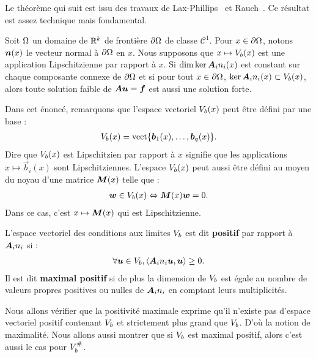 Le théorème qui suit est issu des travaux de Lax-Phillips~\cite{existence_solution_lax_phillips} et Rauch~\cite{existence_solution_rauch}.
Ce résultat est assez technique mais fondamental.

\begin{theorem} \label{thm:lax_phillips}
	Soit $\Omega$ un domaine de $\mathbb{R}^k$ de frontière
	$\partial\Omega$ de classe $\mathcal{C}^1$.
	Pour $x \in \partial\Omega$, notons $\bm{n}(x)$ le vecteur normal
	à $\partial\Omega$ en $x$.
	Nous supposons que $x \mapsto V_b(x)$
	est une application Lipschitzienne par rapport à $x$.
	Si $\dim \ker {\bm{A}_{i}n_{i}}(x)$ est constant sur chaque composante connexe
	de $\partial\Omega$ et si pour tout $x \in \partial\Omega$,
	$\ker {\bm{A}_{i}n_{i}}(x) \subset V_b(x)$,
	alors toute solution faible de $\bm{A} \bm{u} = \bm{f}$
	est aussi une solution forte.
\end{theorem}

Dans cet énoncé, remarquons que l'espace vectoriel $V_b(x)$
peut être défini par une base :
\begin{align}
	V_b(x) = \mathrm{vect} \lbrace
		\bm{b}_1(x), \ldots, \bm{b}_q(x)
	\rbrace .
\end{align}
Dire que $V_b(x)$ est Lipschitzien par rapport à $x$
signifie que les applications $x \mapsto \Vec{b}_i(x)$ sont Lipschitziennes.
L'espace $V_b(x)$ peut aussi être défini au moyen du noyau
d'une matrice $\bm{M}(x)$ telle que :
\begin{align}
	\bm{w} \in V_b(x) \Leftrightarrow \bm{M}(x) \bm{w} = 0 .
\end{align}
Dans ce cas, c'est $x \mapsto \bm{M}(x)$ qui est Lipschitzienne.

\begin{definition}
	L'espace vectoriel des conditions aux limites $V_b$
	est dit \textbf{positif} par rapport à ${\bm{A}_{i}n_{i}}$ si :
	\begin{align}
		\forall \bm{u} \in V_b,
		\left\langle {\bm{A}_{i}n_{i}} \bm{u} , \bm{u} \right\rangle \ge 0 .
	\end{align}
	Il est dit \textbf{maximal positif} si de plus la dimension
	de $V_b$ est égale au nombre de valeurs propres
	positives ou nulles de ${\bm{A}_{i}n_{i}}$ en comptant leurs multiplicités.
\end{definition}

Nous allons vérifier que la positivité maximale exprime
qu'il n'existe pas d'espace vectoriel positif contenant $V_b$
et strictement plus grand que $V_b$.
D'où la notion de maximalité.
Nous allons aussi montrer que si $V_b$
est maximal positif, alors c'est aussi le cas pour $V_b^{\#}$.

